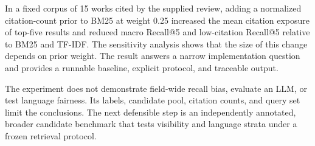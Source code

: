 \documentclass[acmsmall,nonacm]{acmart}
\begin{document}
In a fixed corpus of 15 works cited by the supplied review, adding a normalized citation-count prior to BM25 at weight 0.25 increased the mean citation exposure of top-five results and reduced macro Recall@5 and low-citation Recall@5 relative to BM25 and TF-IDF. The sensitivity analysis shows that the size of this change depends on prior weight. The result answers a narrow implementation question and provides a runnable baseline, explicit protocol, and traceable output.\par

The experiment does not demonstrate field-wide recall bias, evaluate an LLM, or test language fairness. Its labels, candidate pool, citation counts, and query set limit the conclusions. The next defensible step is an independently annotated, broader candidate benchmark that tests visibility and language strata under a frozen retrieval protocol.\par




\end{document}
